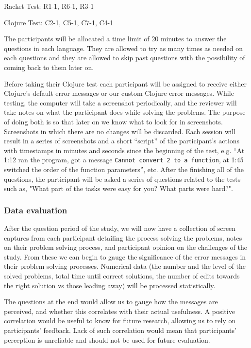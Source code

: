 \documentclass[12pt]{article}
\begin{document}
Racket Test: R1-1, R6-1, R3-1

Clojure Test: C2-1, C5-1, C7-1, C4-1


	The participants will be allocated a time limit of 20 minutes to answer the questions in each language. 
They are allowed to try as many times as needed on each questions and they are allowed to skip past questions with the possibility of coming back to them later on. 

Before taking their Clojure test each participant will  be assigned to receive either Clojure's default error messages or our custom Clojure error messages.
While testing, the computer will take a screenshot periodically, and the reviewer will take notes on what the participant does while solving the problems.
The purpose of doing both is so that later on we know what to look for in screenshots. Screenshots in which there are no changes will be discarded. 
Each session will result in a series of screenshots and a short ``script'' of the participant's actions with timestamps in minutes and seconds since the beginning of the test, e.g. ``At 1:12 ran the program, got a message \texttt{Cannot convert 2 to a function}, at 1:45 switched the order of the function parameters'', etc.
After the finishing all of the questions, the participant will be asked a series of questions related to the tests such as, "What part of the tasks were easy for you? What parts were hard?".

\subsubsection{Data evaluation}\label{subsec:evaluation}

After the question period of the study, we will now have a collection of screen captures from each participant detailing the process solving the problems, notes on their problem solving process, and participant opinion on the challenges of the study.
From these we can begin to gauge the significance of the error messages in their problem solving processes. 
Numerical data (the number and the level of the solved problems, total time until correct solutions, the number of edits towards the right solution vs those leading away) will be processed statistically. 

The questions at the end would allow us to gauge how the messages are perceived, and whether this correlates with their actual usefulness. A positive correlation would be useful to know for future research, allowing us to rely on participants' feedback. 
Lack of such correlation would mean that participants' perception is unreliable and should not be used for future evaluation.  
\end{document}
